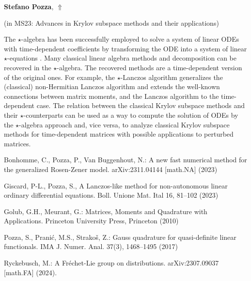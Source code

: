 \documentclass[ILAS2025-program.tex]{subfiles}
\begin{document}
\hypertarget{down0394}{}\begin{ilasabstract}
    
\textbf{Stefano Pozza},  \hfill \hyperlink{up0394}{$\Uparrow$}
    
    
(in {\color{mstitle}MS23: Advances in Krylov subspace methods and their applications})
        
\mtskip
    \begin{bibunit}
        The $\star$-algebra \cite{Man24} has been successfully employed to solve a system of linear ODEs with time-dependent coefficients by transforming the ODE into a system of linear $\star$-equations \cite{BonPozVan23,GisPoz}. Many classical linear algebra methods and decomposition can be recovered in the $\star$-algebra. The recovered methods are a time-dependent version of the original ones. For example, the $\star$-Lanczos algorithm \cite{GisPoz} generalizes the (classical) non-Hermitian Lanczos algorithm and extends the well-known connections between matrix moments, and the Lanczos algorithm \cite{GolMeu,PozPraStr} to the time-dependent case.
The relation between the classical Krylov subspace methods and their $\star$-counterparts can be used as a way to compute the solution of ODEs by the $\star$-algebra approach and, vice versa, to analyze classical Krylov subspace methods for time-dependent matrices with possible applications to perturbed matrices.

\begin{thebibliography}{99}
Bonhomme, C., Pozza, P., Van Buggenhout, N.:
A new fast numerical method for the generalized Rosen-Zener model. arXiv:2311.04144 [math.NA] (2023)

Giscard, P-L., Pozza, S., A Lanczos-like method for non-autonomous linear ordinary differential equations. Boll. Unione Mat. Ital 16, 81--102 (2023)

Golub, G.H., Meurant, G.: Matrices, Moments and Quadrature with Applications. Princeton University Press, Princeton (2010)

Pozza, S., Prani\'c, M.S., Strako\v s, Z.: Gauss quadrature for quasi-definite linear functionals. IMA J. Numer. Anal. 37(3), 1468--1495 (2017)

Ryckebusch, M.: A Fr\'echet-Lie group on distributions. arXiv:2307.09037 [math.FA] (2024).

\end{thebibliography}
        \end{bibunit}
        
\end{ilasabstract}
    
\end{document}
